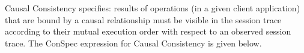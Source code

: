 \documentclass{sig-alternate-05-2015}
\begin{document}
 \par Causal Consistency specifies: results of operations (in a given client application) that are bound by a causal relationship \cite{Bailis:2013:BCC:2463676.2465279} must be  visible in the session trace according to their mutual execution order with respect to an observed session trace. The ConSpec expression for Causal Consistency is given below.
\end{document}

